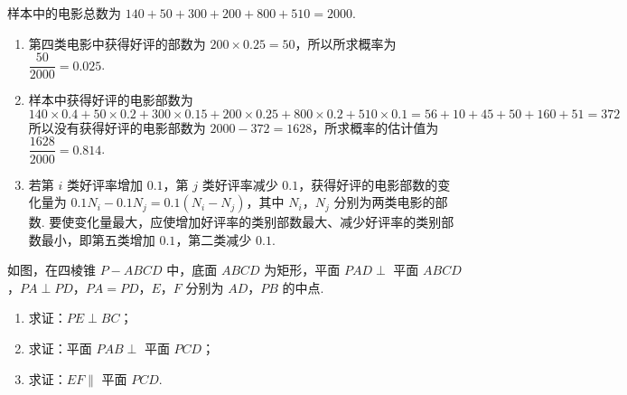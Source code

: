 \begin{solution}
样本中的电影总数为 \(140+50+300+200+800+510=2000\).

\begin{enumerate}
\item 第四类电影中获得好评的部数为 \(200\times0.25=50\)，所以所求概率为 \(\dfrac{50}{2000}=0.025\).
\item 样本中获得好评的电影部数为
\[
140\times0.4+50\times0.2+300\times0.15+200\times0.25+800\times0.2+510\times0.1=56+10+45+50+160+51=372
\]
所以没有获得好评的电影部数为 \(2000-372=1628\)，所求概率的估计值为 \(\dfrac{1628}{2000}=0.814\).
\item 若第 \(i\) 类好评率增加 \(0.1\)，第 \(j\) 类好评率减少 \(0.1\)，获得好评的电影部数的变化量为 \(0.1N_i-0.1N_j=0.1(N_i-N_j)\)，其中 \(N_i\)，\(N_j\) 分别为两类电影的部数. 要使变化量最大，应使增加好评率的类别部数最大、减少好评率的类别部数最小，即第五类增加 \(0.1\)，第二类减少 \(0.1\).
\end{enumerate}
\end{solution}


\begin{problem}

如图，在四棱锥 \(P-ABCD\) 中，底面 \(ABCD\) 为矩形，平面 \(PAD\perp\) 平面 \(ABCD\)，\(PA\perp PD\)，\(PA=PD\)，\(E\)，\(F\) 分别为 \(AD\)，\(PB\) 的中点.

\begin{enumerate}
\item 求证：\(PE\perp BC\)；
\item 求证：平面 \(PAB\perp\) 平面 \(PCD\)；
\item 求证：\(EF\parallel\) 平面 \(PCD\).
\end{enumerate}

\begingroup
{}
\endgroup
\FloatBarrier
\end{problem}

